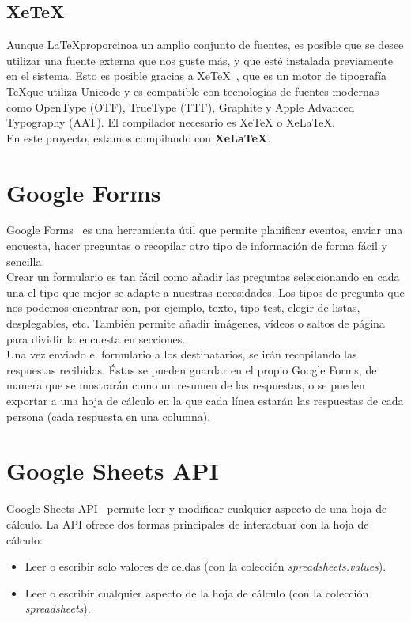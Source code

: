 \documentclass[a4paper, 12pt]{book}
\begin{document}
\subsection{XeTeX}
\label{xetex}
Aunque \LaTeX proporcinoa un amplio conjunto de fuentes, es posible que se desee utilizar una fuente externa que nos guste más, y que esté instalada previamente en el sistema. Esto es posible gracias a XeTeX~\cite{xetex:1}, que es un motor de tipografía \TeX que utiliza Unicode y es compatible con tecnologías de fuentes modernas como OpenType (OTF), TrueType (TTF), Graphite y Apple Advanced Typography (AAT). El compilador necesario es XeTeX o XeLaTeX.\\

En este proyecto, estamos compilando con \textbf{XeLaTeX}.



\section{Google Forms}
\label{sec:googleforms}
Google Forms~\cite{forms:1} es una herramienta útil que permite planificar eventos, enviar una encuesta, hacer preguntas o recopilar otro tipo de información de forma fácil y sencilla.\\

Crear un formulario es tan fácil como añadir las preguntas seleccionando en cada una el tipo que mejor se adapte a nuestras necesidades. Los tipos de pregunta que nos podemos encontrar son, por ejemplo, texto, tipo test, elegir de listas, desplegables, etc. También permite añadir imágenes, vídeos o saltos de página para dividir la encuesta en secciones.\\

Una vez enviado el formulario a los destinatarios, se irán recopilando las respuestas recibidas. Éstas se pueden guardar en el propio Google Forms, de manera que se mostrarán como un resumen de las respuestas, o se pueden exportar a una hoja de cálculo en la que cada línea estarán las respuestas de cada persona (cada respuesta en una columna).


\section{Google Sheets API}
\label{sec:googlesheet}
Google Sheets API~\cite{sheet:1} permite leer y modificar cualquier aspecto de una hoja de cálculo. La API ofrece dos formas principales de interactuar con la hoja de cálculo:
\begin{itemize}
	\item Leer o escribir solo valores de celdas (con la colección \textit{spreadsheets.values}).
	\item Leer o escribir cualquier aspecto de la hoja de cálculo (con la colección \textit{spreadsheets}).
\end{itemize}
\end{document}
